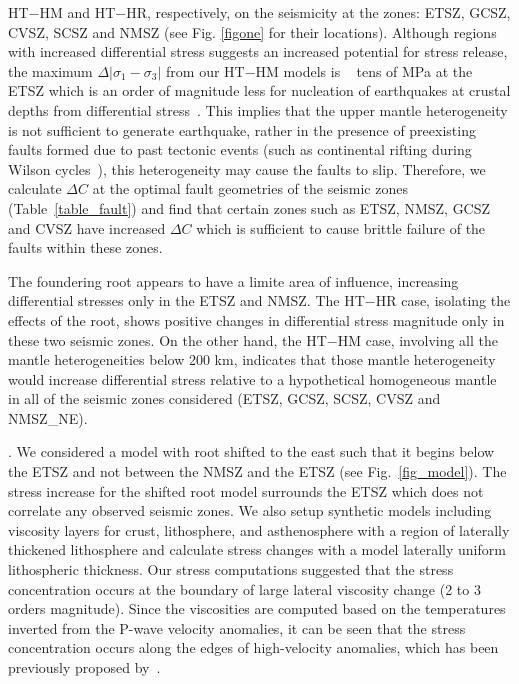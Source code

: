 \documentclass[draft,linenumbers]{agujournal2018}
\begin{document}
    HT$-$HM and HT$-$HR, respectively, on the seismicity at the zones: ETSZ, GCSZ, CVSZ, SCSZ and NMSZ (see Fig. \ref{figone} for their locations). Although regions with increased differential stress suggests an increased potential for stress release, the maximum $\Delta|\sigma_1 - \sigma_3|$ from our HT$-$HM models is ~ tens of MPa at the ETSZ which is an order of magnitude less for nucleation of earthquakes at crustal depths from differential stress~\citep[e.g.][]{sibson1990rupture}. This implies that the upper mantle heterogeneity is not sufficient to generate earthquake, rather in the presence of preexisting faults formed due to past tectonic events (such as continental rifting during Wilson cycles~\citep{thomas2006tectonic}), this heterogeneity may cause the faults to slip. Therefore, we calculate $\Delta C$ at the optimal fault geometries of the seismic zones (Table~\ref{table_fault}) and find that certain zones such as ETSZ, NMSZ, GCSZ and CVSZ have increased $\Delta C$ which is sufficient to cause brittle failure of the faults within these zones.

     The foundering root appears to have a limite area of influence, increasing differential stresses only in the ETSZ and NMSZ. The HT$-$HR case, isolating the effects of the root, shows positive changes in differential stress magnitude only in these two seismic zones. On the other hand, the HT$-$HM case, involving all the mantle heterogeneities below 200 km, indicates that those mantle heterogeneity would increase differential stress relative to a hypothetical homogeneous mantle in all of the seismic zones considered (ETSZ, GCSZ, SCSZ, CVSZ and NMSZ\_NE). 
     
     . We considered a model with root shifted to the east such that it begins below the ETSZ and not between the NMSZ and the ETSZ (see Fig.~\ref{fig_model}). The stress increase for the shifted root model surrounds the ETSZ which does not correlate any observed seismic zones. We also setup synthetic models including viscosity layers for crust, lithosphere, and asthenosphere with a region of laterally thickened lithosphere and calculate stress changes with a model laterally uniform lithospheric thickness. Our stress computations suggested that the stress concentration occurs at the boundary of large lateral viscosity change (2 to 3 orders magnitude). Since the viscosities are computed based on the temperatures inverted from the P-wave velocity anomalies, it can be seen that the stress concentration occurs along the edges of high-velocity anomalies, which has been previously proposed by~\citet{zhang2009tomographic}. 
    
\end{document}
